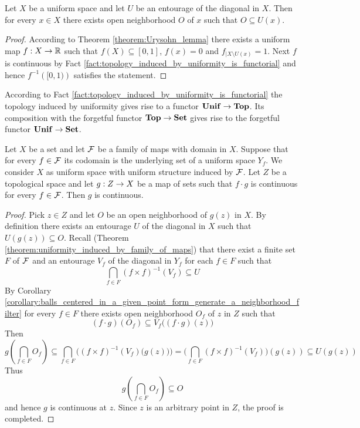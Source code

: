 \begin{corollary}\label{corollary:balls_centered_in_a_given_point_form_generate_a_neighborhood_filter}
	Let $X$ be a uniform space and let $U$ be an entourage of the diagonal in $X$. Then for every $x \in X$ there exists open neighborhood $O$ of $x$ such that $O \subseteq U(x)$.
\end{corollary}
\begin{proof}
	According to Theorem \ref{theorem:Urysohn_lemma} there exists a uniform map $f:X\rightarrow {\mathbb R}$ such that $f(X) \subseteq [0,1]$, $f(x) = 0$ and $f_{\mid X\setminus U(x)} = 1$. Next $f$ is continuous by Fact \ref{fact:topology_induced_by_uniformity_is_functorial} and hence $f^{-1}\left([0,1)\right)$ satisfies the statement.
\end{proof}
\noindent
According to Fact \ref{fact:topology_induced_by_uniformity_is_functorial} the topology induced by uniformity gives rise to a functor $\mathbf{Unif} \rightarrow \mathbf{Top}$. Its composition with the forgetful functor $\mathbf{Top} \rightarrow \mathbf{Set}$ gives rise to the forgetful functor $\mathbf{Unif} \rightarrow \mathbf{Set}$.

\begin{theorem}\label{theorem:uniformity_induced_by_family_of_maps_induces_topology_induced_by_family}
	Let $X$ be a set and let ${\mathcal F}$ be a family of maps with domain in $X$. Suppose that for every $f\in {\mathcal F}$ its codomain is the underlying  set of a uniform space $Y_f$. We consider $X$ as uniform space with uniform structure induced by ${\mathcal F}$. Let $Z$ be a topological space and let $g:Z\rightarrow X$ be a map of sets such that $f \cdot g$ is continuous for every $f \in {\mathcal F}$. Then $g$ is continuous.
\end{theorem}
\begin{proof}
	Pick $z \in Z$ and let $O$ be an open neighborhood of $g(z)$ in $X$. By definition there exists an entourage $U$ of the diagonal in $X$ such that $U\left(g(z)\right) \subseteq O$. Recall (Theorem \ref{theorem:uniformity_induced_by_family_of_maps}) that there exist a finite set $F$ of ${\mathcal F}$ and an entourage $V_f$ of the diagonal in $Y_f$ for each $f\in F$ such that
	$$\bigcap_{f\in F}\left(f\times f\right)^{-1}(V_f) \subseteq U$$
	By Corollary \ref{corollary:balls_centered_in_a_given_point_form_generate_a_neighborhood_filter} for every $f \in F$ there exists open neighborhood $O_f$ of $z$ in $Z$ such that
	$$\left(f\cdot g\right)\left(O_f\right) \subseteq V_f\bigg(\left(f\cdot g\right)(z)\bigg)$$
	Then
	$$g\left(\bigcap_{f\in F}O_f\right) \subseteq \bigcap_{f\in F}\bigg(\left(f\times f\right)^{-1}(V_f)\big(g(z)\big)\bigg) = \bigg(\bigcap_{f\in F}\left(f\times f\right)^{-1}(V_f)\bigg)\left(g(z)\right) \subseteq U\left(g(z)\right)$$
	Thus
	$$g\left(\bigcap_{f\in F}O_f\right) \subseteq O$$
	and hence $g$ is continuous at $z$. Since $z$ is an arbitrary point in $Z$, the proof is completed.
\end{proof}

